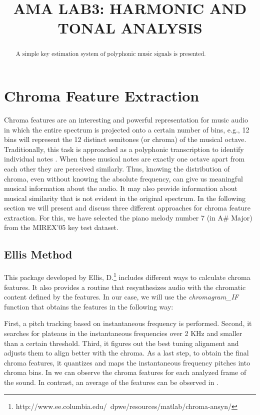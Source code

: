 \documentclass{article}
\title{AMA LAB3: HARMONIC AND TONAL ANALYSIS}
\begin{document}
%
\maketitle
%
\begin{abstract}
A simple key estimation system of polyphonic music signals is presented.
\end{abstract}
%
\section{Chroma Feature Extraction}\label{sec:chroma}
Chroma features are an interesting and powerful representation for music audio in which the entire spectrum is projected onto a certain number of bins, e.g., 12 bins will represent the 12 distinct semitones (or chroma) of the musical octave. Traditionally, this task is approached as a polyphonic transcription to identify individual notes \cite{Fujishima:1999}. When these musical notes are exactly one octave apart from each other they are perceived similarly. Thus, knowing the distribution of chroma, even without knowing the absolute frequency, can give us meaningful musical information about the audio. It may also provide information about musical similarity that is not evident in the original spectrum. In the following section we will present and discuss three different approaches for chroma feature extraction. For this, we have selected the piano melody number 7 (in A\# Major) from the MIREX'05 key test dataset.

\subsection{Ellis Method}\label{subsec:chroma_ellis} %
This package developed by Ellis, D.\footnote{http://www.ee.columbia.edu/~dpwe/resources/matlab/chroma-ansyn/} includes different ways to calculate chroma features. It also provides a routine that resynthesizes audio with the chromatic content defined by the features. In our case, we will use the {\it chromagram\_IF} function that obtains the features in the following way:

First, a pitch tracking based on instantaneous frequency is performed. Second, it searches for plateaus in the instantaneous frequencies over 2 KHz and smaller than a certain threshold. Third, it figures out the best tuning alignment and adjusts them to align better with the chroma. As a last step, to obtain the final chroma features, it quantizes and maps the instantaneous frequency pitches into chroma bins. In  we can observe the chroma features for each analyzed frame of the sound. In contrast, an average of the features can be observed in .
\end{document}
